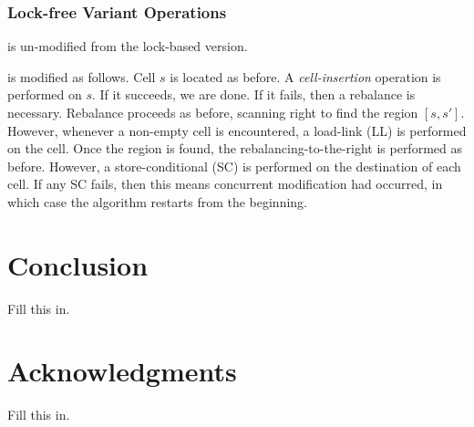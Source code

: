 \documentclass{style}
\begin{document}
\subsubsection{Lock-free Variant Operations}

\Search{} is un-modified from the lock-based version.

\Insert{} is modified as follows. Cell $s$ is located as before. A
\textit{cell-insertion} operation is performed on $s$. If it succeeds, we are
done. If it fails, then a rebalance is necessary. Rebalance proceeds as before,
scanning right to find the region $[s, s']$. However, whenever a non-empty cell
is encountered, a load-link (LL) is performed on the cell.  Once the region is
found, the rebalancing-to-the-right is performed as before.  However, a
store-conditional (SC) is performed on the destination of each cell.  If any SC
fails, then this means concurrent modification had occurred, in which case the
algorithm restarts from the beginning.

\section{Conclusion}
Fill this in.

\section{Acknowledgments}
Fill this in.

%



\end{document}
